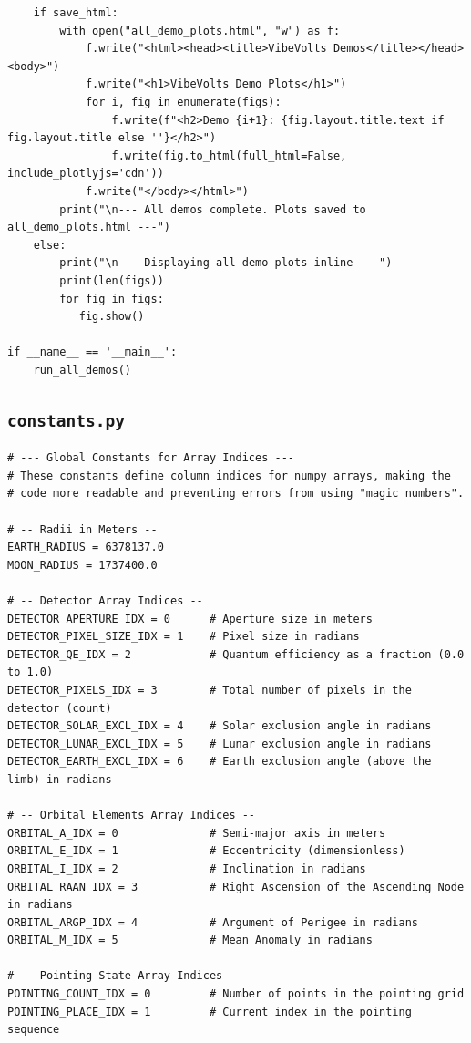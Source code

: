 \documentclass[11pt]{article}
\begin{document}
\begin{Verbatim}
    if save_html:
        with open("all_demo_plots.html", "w") as f:
            f.write("<html><head><title>VibeVolts Demos</title></head><body>")
            f.write("<h1>VibeVolts Demo Plots</h1>")
            for i, fig in enumerate(figs):
                f.write(f"<h2>Demo {i+1}: {fig.layout.title.text if fig.layout.title else ''}</h2>")
                f.write(fig.to_html(full_html=False, include_plotlyjs='cdn'))
            f.write("</body></html>")
        print("\n--- All demos complete. Plots saved to all_demo_plots.html ---")
    else:
        print("\n--- Displaying all demo plots inline ---")
        print(len(figs))
        for fig in figs:
           fig.show()

if __name__ == '__main__':
    run_all_demos()
\end{Verbatim}
\subsection{\texttt{constants.py}}
\begin{Verbatim}
# --- Global Constants for Array Indices ---
# These constants define column indices for numpy arrays, making the
# code more readable and preventing errors from using "magic numbers".

# -- Radii in Meters --
EARTH_RADIUS = 6378137.0
MOON_RADIUS = 1737400.0

# -- Detector Array Indices --
DETECTOR_APERTURE_IDX = 0      # Aperture size in meters
DETECTOR_PIXEL_SIZE_IDX = 1    # Pixel size in radians
DETECTOR_QE_IDX = 2            # Quantum efficiency as a fraction (0.0 to 1.0)
DETECTOR_PIXELS_IDX = 3        # Total number of pixels in the detector (count)
DETECTOR_SOLAR_EXCL_IDX = 4    # Solar exclusion angle in radians
DETECTOR_LUNAR_EXCL_IDX = 5    # Lunar exclusion angle in radians
DETECTOR_EARTH_EXCL_IDX = 6    # Earth exclusion angle (above the limb) in radians

# -- Orbital Elements Array Indices --
ORBITAL_A_IDX = 0              # Semi-major axis in meters
ORBITAL_E_IDX = 1              # Eccentricity (dimensionless)
ORBITAL_I_IDX = 2              # Inclination in radians
ORBITAL_RAAN_IDX = 3           # Right Ascension of the Ascending Node in radians
ORBITAL_ARGP_IDX = 4           # Argument of Perigee in radians
ORBITAL_M_IDX = 5              # Mean Anomaly in radians

# -- Pointing State Array Indices --
POINTING_COUNT_IDX = 0         # Number of points in the pointing grid
POINTING_PLACE_IDX = 1         # Current index in the pointing sequence
\end{Verbatim}
\end{document}
